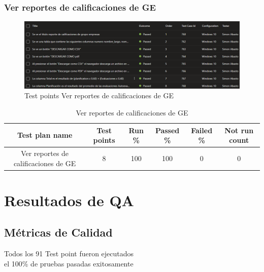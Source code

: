 \documentclass[12pt,letterpaper]{article}
\begin{document}
\subsubsection{Ver reportes de calificaciones de GE}
\begin{figure}[H]
        \centering
        \includegraphics[width=1\linewidth]{Ver reportes de calificaciones de GE.png}
        \caption{Test points Ver reportes de calificaciones de GE}
    \end{figure}

 \begin{table}[h] %
    \centering %
    \caption{Ver reportes de calificaciones de GE} %
    \begin{tabular}{|c|c|c|c|c|c|}
        \rowcolor{green} %
        \hline
        Test plan name & Test points & Run \% & Passed \% & Failed \% & Not run count \\
        \hline
   Ver reportes de calificaciones de GE& 8 & 100 & 100 & 0 & 0 \\
        \hline
    \end{tabular}
\end{table}



    
\section{Resultados de QA}

    \subsection{Métricas de Calidad}
    Todos los 91 Test point fueron ejecutados 
    \\
    el 100\% de pruebas pasadas exitosamente
    
\end{document}
